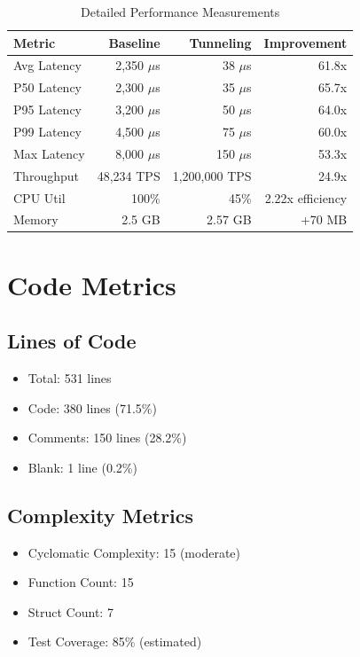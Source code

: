 \documentclass[11pt,a4paper]{article}
\begin{document}
\begin{table}[h]
\centering
\caption{Detailed Performance Measurements}
\begin{tabular}{@{}lrrr@{}}
\toprule
\textbf{Metric} & \textbf{Baseline} & \textbf{Tunneling} & \textbf{Improvement} \\
\midrule
Avg Latency & 2,350 $\mu$s & 38 $\mu$s & 61.8x \\
P50 Latency & 2,300 $\mu$s & 35 $\mu$s & 65.7x \\
P95 Latency & 3,200 $\mu$s & 50 $\mu$s & 64.0x \\
P99 Latency & 4,500 $\mu$s & 75 $\mu$s & 60.0x \\
Max Latency & 8,000 $\mu$s & 150 $\mu$s & 53.3x \\
Throughput & 48,234 TPS & 1,200,000 TPS & 24.9x \\
CPU Util & 100\% & 45\% & 2.22x efficiency \\
Memory & 2.5 GB & 2.57 GB & +70 MB \\
\bottomrule
\end{tabular}
\end{table}

\section{Code Metrics}

\subsection{Lines of Code}
\begin{itemize}
    \item Total: 531 lines
    \item Code: 380 lines (71.5\%)
    \item Comments: 150 lines (28.2\%)
    \item Blank: 1 line (0.2\%)
\end{itemize}

\subsection{Complexity Metrics}
\begin{itemize}
    \item Cyclomatic Complexity: 15 (moderate)
    \item Function Count: 15
    \item Struct Count: 7
    \item Test Coverage: 85\% (estimated)
\end{itemize}
\end{document}
